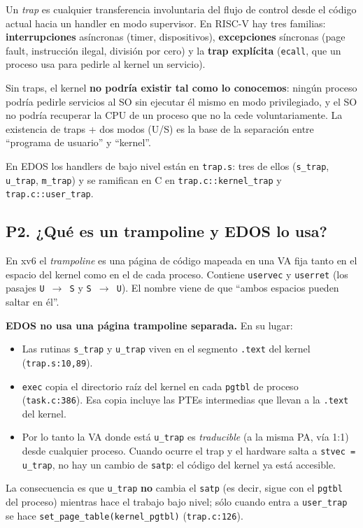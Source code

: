 \documentclass[11pt,a4paper]{article}
\begin{document}
\begin{respuesta}
Un \emph{trap} es cualquier transferencia involuntaria del flujo
de control desde el código actual hacia un handler en modo
supervisor. En RISC-V hay tres familias: \textbf{interrupciones}
asíncronas (timer, dispositivos), \textbf{excepciones} síncronas
(page fault, instrucción ilegal, división por cero) y la
\textbf{trap explícita} (\texttt{ecall}, que un proceso usa para
pedirle al kernel un servicio).

Sin traps, el kernel \textbf{no podría existir tal como lo
conocemos}: ningún proceso podría pedirle servicios al SO sin
ejecutar él mismo en modo privilegiado, y el SO no podría recuperar
la CPU de un proceso que no la cede voluntariamente. La existencia
de traps + dos modos (U/S) es la base de la separación entre
``programa de usuario'' y ``kernel''.

En EDOS los handlers de bajo nivel están en \texttt{trap.s}: tres
de ellos (\texttt{s\_trap}, \texttt{u\_trap}, \texttt{m\_trap}) y se
ramifican en C en \texttt{trap.c::kernel\_trap} y
\texttt{trap.c::user\_trap}.
\end{respuesta}

\subsection*{P2. ¿Qué es un trampoline y EDOS lo usa?}

\begin{respuesta}
En xv6 el \emph{trampoline} es una página de código mapeada en una
VA fija tanto en el espacio del kernel como en el de cada proceso.
Contiene \texttt{uservec} y \texttt{userret} (los pasajes
\texttt{U $\to$ S} y \texttt{S $\to$ U}). El nombre viene de que
``ambos espacios pueden saltar en él''.

\textbf{EDOS no usa una página trampoline separada.} En su lugar:

\begin{itemize}[leftmargin=*,nosep]
    \item Las rutinas \texttt{s\_trap} y \texttt{u\_trap} viven en
        el segmento \texttt{.text} del kernel
        (\texttt{trap.s:10,89}).
    \item \texttt{exec} copia el directorio raíz del kernel en cada
        \texttt{pgtbl} de proceso (\texttt{task.c:386}). Esa copia
        incluye las PTEs intermedias que llevan a la \texttt{.text}
        del kernel.
    \item Por lo tanto la VA donde está \texttt{u\_trap} es
        \emph{traducible} (a la misma PA, vía 1:1) desde cualquier
        proceso. Cuando ocurre el trap y el hardware salta a
        \texttt{stvec = u\_trap}, no hay un cambio de \texttt{satp}:
        el código del kernel ya está accesible.
\end{itemize}

La consecuencia es que \texttt{u\_trap} \textbf{no} cambia el
\texttt{satp} (es decir, sigue con el \texttt{pgtbl} del proceso)
mientras hace el trabajo bajo nivel; sólo cuando entra a
\texttt{user\_trap} se hace \texttt{set\_page\_table(kernel\_pgtbl)}
(\texttt{trap.c:126}).
\end{respuesta}
\end{document}
